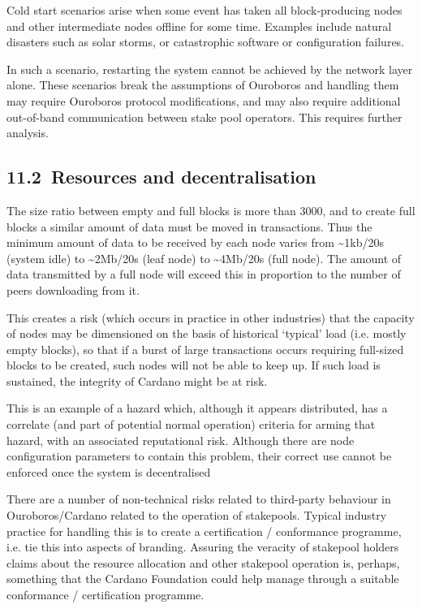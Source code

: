 \documentclass[]{article}
\begin{document}
Cold start scenarios arise when some event has taken all block-producing
nodes and other intermediate nodes offline for some time. Examples
include natural disasters such as solar storms, or catastrophic software
or configuration failures.

In such a scenario, restarting the system cannot be achieved by the
network layer alone. These scenarios break the assumptions of Ouroboros
and handling them may require Ouroboros protocol modifications, and may
also require additional out-of-band communication between stake pool
operators. This requires further analysis.

\hypertarget{resources-and-decentralisation}{%
\subsection{​11.2​~Resources and
decentralisation}\label{resources-and-decentralisation}}

The size ratio between empty and full blocks is more than 3000, and to
create full blocks a similar amount of data must be moved in
transactions. Thus the minimum amount of data to be received by each
node varies from \textasciitilde{}1kb/20s (system idle) to
\textasciitilde{}2Mb/20s (leaf node) to \textasciitilde{}4Mb/20s (full
node). The amount of data transmitted by a full node will exceed this in
proportion to the number of peers downloading from it.

This creates a risk (which occurs in practice in other industries) that
the capacity of nodes may be dimensioned on the basis of historical
`typical' load (i.e. mostly empty blocks), so that if a burst of large
transactions occurs requiring full-sized blocks to be created, such
nodes will not be able to keep up. If such load is sustained, the
integrity of Cardano might be at risk.

This is an example of a hazard which, although it appears distributed,
has a correlate (and part of potential normal operation) criteria for
arming that hazard, with an associated reputational risk. Although there
are node configuration parameters to contain this problem, their correct
use cannot be enforced once the system is decentralised

There are a number of non-technical risks related to third-party
behaviour in Ouroboros/Cardano related to the operation of stakepools.
Typical industry practice for handling this is to create a certification
/ conformance programme, i.e. tie this into aspects of branding.
Assuring the veracity of stakepool holders claims about the resource
allocation and other stakepool operation is, perhaps, something that the
Cardano Foundation could help manage through a suitable conformance /
certification programme.
\end{document}
